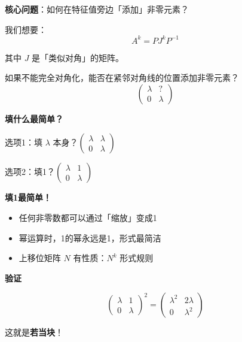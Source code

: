 \documentclass[aspectratio=169,12pt]{beamer}
\begin{document}
\begin{frame}
\fontsize{11}{13}\selectfont
\centerline{\textbf{核心问题}：如何在特征值旁边「添加」非零元素？}

\bigskip
我们想要：
\[
A^k = P J^k P^{-1}
\]

其中 $J$ 是「类似对角」的矩阵。

\pause
\bigskip
如果不能完全对角化，能否在紧邻对角线的位置添加非零元素？
\[
\begin{pmatrix}
\lambda & ? \\
0 & \lambda
\end{pmatrix}
\]
\end{frame}

\begin{frame}
\fontsize{10}{12}\selectfont
\centerline{\textbf{填什么最简单？}}

\bigskip
选项1：填 $\lambda$ 本身？$\begin{pmatrix} \lambda & \lambda \\ 0 & \lambda \end{pmatrix}$

\bigskip
选项2：填1？$\begin{pmatrix} \lambda & 1 \\ 0 & \lambda \end{pmatrix}$

\pause
\bigskip
\centerline{\textbf{填1最简单！}}

\begin{itemize}
    \item 任何非零数都可以通过「缩放」变成1
    \item 幂运算时，1的幂永远是1，形式最简洁
    \item 上移位矩阵 $N$ 有性质：$N^k$ 形式规则
\end{itemize}
\end{frame}

\begin{frame}
\fontsize{10}{12}\selectfont
\centerline{\textbf{验证}}

\[
\begin{pmatrix} \lambda & 1 \\ 0 & \lambda \end{pmatrix}^2
= \begin{pmatrix} \lambda^2 & 2\lambda \\ 0 & \lambda^2 \end{pmatrix}
\]

\bigskip
\pause
这就是\textbf{若当块}！
\end{frame}
\end{document}
